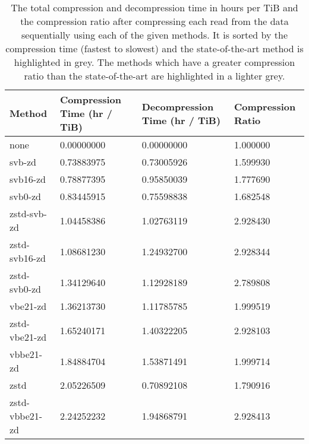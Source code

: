 \begin{table}
	\caption[The total compression and
	decompression time in hours per TiB and the compression ratio after
	compressing each read from the data sequentially using each of the given
	methods. It is sorted by the compression time (fastest to slowest).]{\label{tab:results-time-com} The total compression and
	decompression time in hours per TiB and the compression ratio after
	compressing each read from the data sequentially using each of the given
	methods. It is sorted by the compression time (fastest to slowest) and the state-of-the-art
	method is highlighted in grey. The methods which have a greater
	compression ratio than the state-of-the-art are highlighted in a lighter
	grey.}
	\begin{tabular}{|l|l|l|l|}
	    \hline
	    Method & Compression Time (hr / TiB) & Decompression Time (hr / TiB) & Compression Ratio \\
\hline
		none    & 0.00000000      & 0.00000000    &1.000000\\
             svb-zd     & 0.73883975      & 0.73005926    &1.599930\\
           svb16-zd     & 0.78877395      & 0.95850039    &1.777690\\
            svb0-zd     & 0.83445915      & 0.75598838    &1.682548\\
		\rowcolor{gray}
        zstd-svb-zd     & 1.04458386      & 1.02763119    &2.928430\\
      zstd-svb16-zd     & 1.08681230      & 1.24932700    &2.928344\\
       zstd-svb0-zd     & 1.34129640      & 1.12928189    &2.789808\\
           vbe21-zd     & 1.36213730      & 1.11785785    &1.999519\\
      zstd-vbe21-zd     & 1.65240171      & 1.40322205    &2.928103\\
          vbbe21-zd     & 1.84884704      & 1.53871491    &1.999714\\
               zstd     & 2.05226509      & 0.70892108    &1.790916\\
     zstd-vbbe21-zd     & 2.24252232      & 1.94868791    &2.928413\\

\end{tabular}
\end{table}
